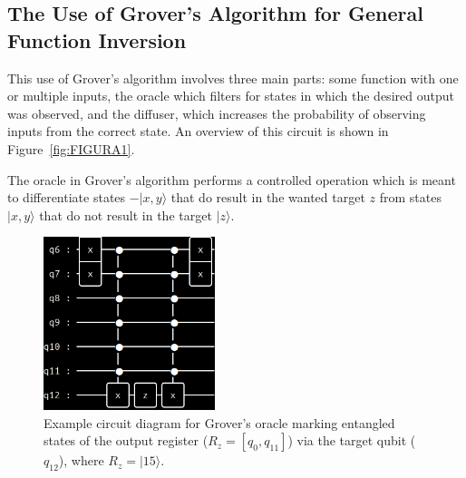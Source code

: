 \documentclass[twocolumn]{cinc}
\begin{document}
  \subsection{The Use of Grover's Algorithm for General Function Inversion} 

  
  This use of Grover's algorithm involves three main parts: some function with
  one or multiple inputs, the oracle which filters for states in which the
  desired output was observed, and the diffuser, which increases the probability 
  of observing inputs from the correct state. An overview of this circuit is
  shown in Figure~\ref{fig:FIGURA1}.

  The oracle in Grover's algorithm performs a controlled operation which is meant
  to differentiate states $-|x,y\rangle$ that do result in the wanted target $z$ from 
  states $|x,y\rangle$ that do not result in the target $|z\rangle$.
  
  \begin{figure}[!ht]
  \centering
  \includegraphics[width=5.0cm]{oracle_15.png}
  \caption{Example circuit diagram for Grover's oracle marking entangled states 
  of the output register ($R_z=[q_0,q_{11}]$) via the target qubit ($q_{12}$), where
  $R_z=|15\rangle$.}\label{fig:FIGURA2}
  \end{figure}
\end{document}
